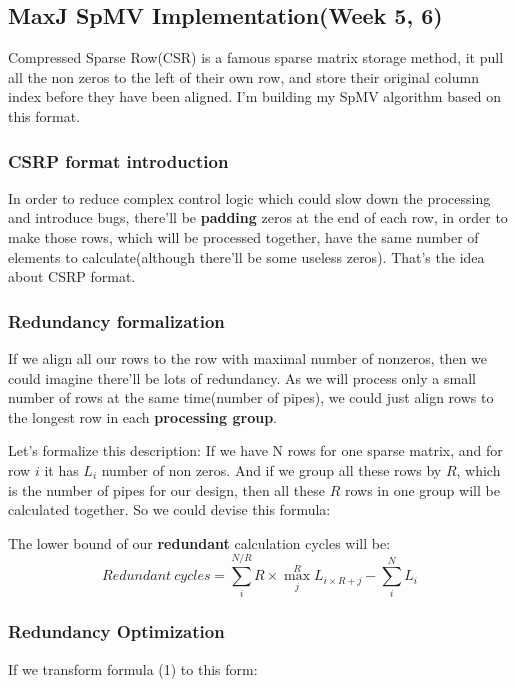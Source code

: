 
\subsection{MaxJ SpMV Implementation(Week 5, 6)}

Compressed Sparse Row(CSR) is a famous sparse matrix storage method, it pull all the non zeros to the left of their own row, and store their original column index before they have been aligned. I'm building my SpMV algorithm based on this format. 

\subsubsection{CSRP format introduction}
In order to reduce complex control logic which could slow down the processing and introduce bugs, there'll be \textbf{padding} zeros at the end of each row, in order to make those rows, which will be processed together, have the same number of elements to calculate(although there'll be some useless zeros). That's the idea about CSRP format.

\subsubsection{Redundancy formalization}

If we align all our rows to the row with maximal number of nonzeros, then we could imagine there'll be lots of redundancy. As we will process only a small number of rows at the same time(number of pipes), we could just align rows to the longest row in each \textbf{processing group}.

Let's formalize this description: If we have N rows for one sparse matrix, and for row $i$ it has $L_i$ number of non zeros. And if we group all these rows by $R$, which is the number of pipes for our design, then all these $R$ rows in one group will be calculated together. So we could devise this formula:

The lower bound of our \textbf{redundant} calculation cycles will be:
\begin{equation}
Redundant\ cycles = \sum_{i}^{N/R} R \times \max_{j}^{R} L_{i\times R + j} - \sum_{i}^{N} L_i
\end{equation}

\subsubsection{Redundancy Optimization}

If we transform formula (1) to this form:

